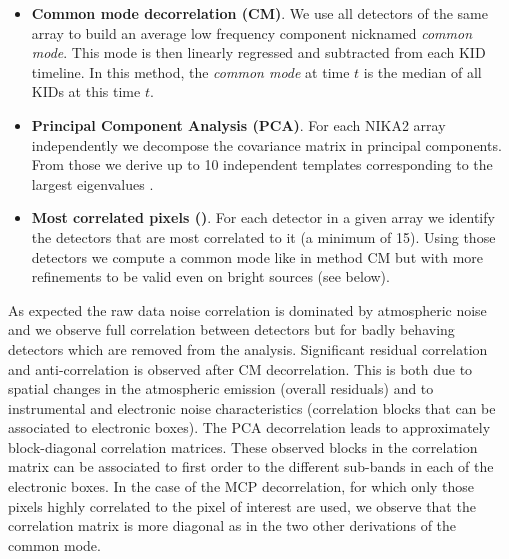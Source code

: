 \begin{itemize}
\item {\bf Common mode decorrelation (CM)}. We use all detectors of the same
  array to build an average low frequency component nicknamed \emph{common
    mode}. This mode is then linearly regressed and subtracted from each KID
  timeline. In this method, the \emph{common mode} at time $t$ is the median of
  all KIDs at this time $t$.

\item {\bf Principal Component Analysis (PCA)}. For each NIKA2 array
  independently we decompose the covariance matrix in principal components. From
  those we derive up to 10 independent templates corresponding to the largest
  eigenvalues .

\item {\bf Most correlated pixels (\cmoneb)}. For each detector in a given array we
  identify the detectors that are most correlated to it (a minimum of
  15). Using those detectors we compute a common mode like in method CM but with
  more refinements to be valid even on bright sources (see below).
\end{itemize}

As expected the raw data
noise correlation is dominated by atmospheric noise and we observe full
correlation between detectors but for badly behaving detectors which are removed
from the analysis. Significant residual correlation and anti-correlation is
observed after CM decorrelation. This is both due to spatial changes in the
atmospheric emission (overall residuals) and to instrumental and electronic
noise characteristics (correlation blocks that can be associated to electronic
boxes).  The PCA decorrelation leads to approximately block-diagonal correlation
matrices. These observed blocks in the correlation matrix can be associated to
first order to the different sub-bands in each of the electronic boxes. In the
case of the MCP decorrelation, for which only those pixels highly correlated to
the pixel of interest are used, we observe that the correlation matrix is more
diagonal as in the two other derivations of the common mode.

